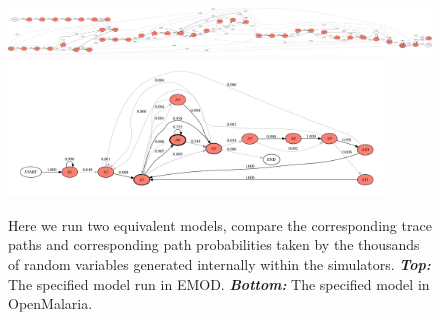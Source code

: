 \documentclass{article}
\begin{document}








\begin{figure}[h!]
	\centering
	\includegraphics[width=\textwidth]{../plots/final_emod_traces__rotated.pdf}
	\includegraphics[width=0.89\textwidth]{../plots/ewan_25_pop_100.pdf}
	\caption{Here we run two equivalent models, compare the corresponding trace paths and corresponding 
	path probabilities taken by the thousands of random variables generated internally within the simulators. \textit{\textbf{Top:}} The specified model run in EMOD. \textit{\textbf{Bottom:}} The specified model in OpenMalaria.}
	\label{fig:plotewan}
\end{figure}
\end{document}
